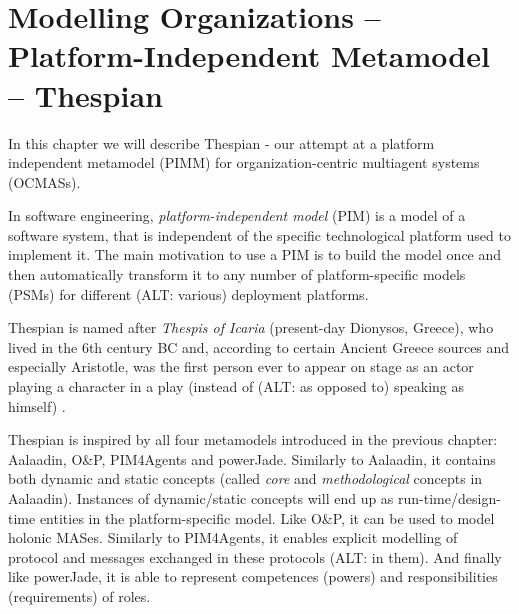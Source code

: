 
\chapter{Modelling Organizations -- Platform-Independent Metamodel -- Thespian}

In this chapter we will describe Thespian - our attempt at a platform independent metamodel (PIMM) for organization-centric multiagent systems (OCMASs).

In software engineering, \textit{platform-independent model} (PIM) is a model of a software system, that is independent of the specific technological platform used to implement it.
The main motivation to use a PIM is to build the model once and then automatically transform it to any number of platform-specific models (PSMs) for different (ALT: various) deployment platforms.

Thespian is named after \textit{Thespis of Icaria} (present-day Dionysos, Greece), who lived in the 6th century BC and, according to certain Ancient Greece sources and especially Aristotle, was the first person ever to appear on stage as an actor playing a character in a play (instead of (ALT: as opposed to) speaking as himself) \cite{Wikipedia-Thespis}.

Thespian is inspired by all four metamodels introduced in the previous chapter: Aalaadin, O\&P, PIM4Agents and powerJade.
Similarly to Aalaadin, it contains both dynamic and static concepts (called \textit{core} and \textit{methodological} concepts in Aalaadin). Instances of dynamic/static concepts will end up as run-time/design-time entities in the platform-specific model.
Like O\&P, it can be used to model holonic MASes.
Similarly to PIM4Agents, it enables explicit modelling of protocol and messages exchanged in these protocols (ALT: in them). 
And finally like powerJade, it is able to represent competences (powers) and responsibilities (requirements) of roles.

